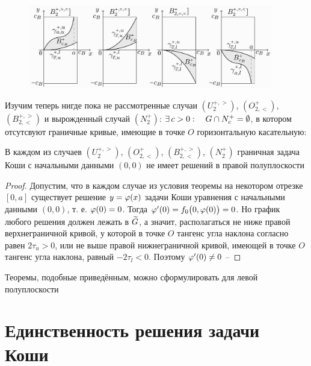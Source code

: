 \begin{figure}[!ht]
	\centering
    \includegraphics[width=0.95\textwidth]{boundary_curves_6}
\end{figure}

Изучим теперь нигде пока не рассмотренные случаи $ (U_2^{+, >}) $, $ (O_{2, <}^+) $, $ (B_{2, <}^{+, >}) $ и вырожденный случай $ (N_2^+) $: $ \exists\, c > 0 : \quad G \cap N_c^+ = \emptyset $, в котором отсутсвуют граничные кривые, имеющие в точке $ O $ горизонтальную касательную:

\begin{theorem}
    В каждом из случаев $ (U_2^{+, >}) $, $ (O_{2, <}^+) $, $ (B_{2, <}^{+, >}) $, $ (N_2^+) $ граничная задача Коши с начальными данными $ (0, 0) $ не имеет решений в правой полуплоскости
\end{theorem}

\begin{proof}
    Допустим, что в каждом случае из условия теоремы на некотором отрезке $ [0, a] $ существует решение $ y = \varphi(x) $ задачи Коши уравнения  с начальными данными $ (0, 0) $, т. е. $ \varphi(0) = 0 $. Тогда $ \varphi'(0) = f_0 \big( 0, \varphi(0) \big) = 0 $. Но график любого решения должен лежать в $ \widetilde{G} $, а значит, располагаться не ниже правой верхнеграничной кривой, у которой в точке $ O $ тангенс угла наклона согласно  равен $ 2\tau_u > 0 $, или не выше правой нижнеграничной кривой, имеющей в точке $ O $ тангенс угла наклона, равный $ -2\tau_l < 0 $. Поэтому $ \varphi'(0) \ne 0 $ -- \contra
\end{proof}

\begin{remark}
	Теоремы, подобные приведённым, можно сформулировать для левой полуплоскости
\end{remark}

\section{Единственность решения задачи Коши}

